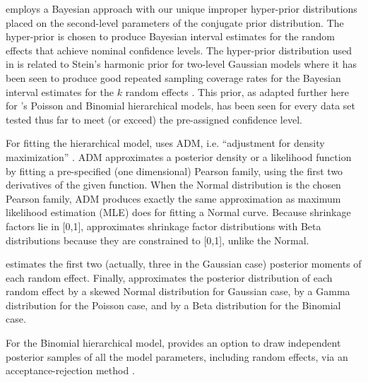 \documentclass[article]{jss}
\begin{document}
 employs a Bayesian approach with our unique improper hyper-prior distributions placed on the second-level parameters of the conjugate prior distribution. The hyper-prior is chosen to produce Bayesian interval   estimates for the random effects that achieve nominal confidence levels. The hyper-prior distribution used in  is related to Stein's harmonic prior for two-level Gaussian models where it has been seen to produce good repeated sampling coverage rates for the Bayesian interval estimates for the $k$ random effects \citep{tang2011, morris2012, kelly2014advances}.  This prior, as adapted further here for 's Poisson and Binomial hierarchical models, has been seen for every data set tested thus far to meet (or exceed) the pre-assigned confidence level. 

For fitting the hierarchical model,  uses ADM, i.e. ``adjustment for density maximization'' \citep{carl1988, morris1997, tang2011}.   ADM approximates a posterior density or a likelihood function by fitting a pre-specified (one dimensional) Pearson family, using the first two derivatives of the given function.  When the Normal distribution is the chosen Pearson family, ADM produces exactly the same approximation as maximum likelihood estimation (MLE) does for fitting a Normal curve.   Because shrinkage factors lie in [0,1],  approximates shrinkage factor distributions with Beta distributions because they are constrained to [0,1], unlike the Normal.

 estimates the first two (actually, three in the Gaussian case) posterior moments of each random effect.   Finally,  approximates the posterior distribution of each random effect by a skewed Normal distribution for Gaussian case, by a Gamma distribution for the Poisson case, and by a Beta distribution for the Binomial case.  



For the Binomial  hierarchical model,  provides an option to draw independent posterior samples of all the model parameters, including random effects, via an acceptance-rejection method \citep{everson2000inference, tang2002fitting}.
\end{document}
